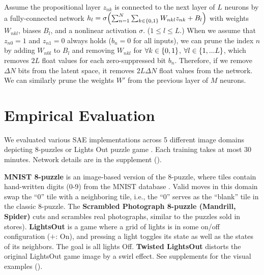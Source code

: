 Assume the propositional layer $z_{nk}$ is connected to the next layer of $L$ neurons
by a fully-connected network $h_l=\sigma{\left(\sum_{n=1}^N \sum_{k\in{\left\{0,1\right\}}} W_{nkl}z_{nk}+B_l\right)}$
with weights $W_{nkl}$, biases $B_l$, and a nonlinear activation $\sigma$.
($1\leq l \leq L$.)
When we assume that $z_{n0}=1$ and $z_{n1}=0$ always holds ($b_n=0$ for all inputs),
we can prune the index $n$
by adding $W_{n0l}$ to $B_l$ and removing $W_{nkl}$ for $\forall k\in{\left\{0,1\right\}}$, $\forall l \in {\left\{1,...L\right\}}$,
which removes $2L$ float values for each zero-suppressed bit $b_n$.
Therefore, if we remove $\Delta N$ bits from the latent space, it removes $2L\Delta N$ float values from the network.
We can similarly prune the weights $W'$ from the previous layer of $M$ neurons.



\section{Empirical Evaluation}
\label{evaluation}

We evaluated various SAE implementations across 5 different
image domains depicting 8-puzzles or Lights Out puzzle game \cite{lightsout}.
Each training takes at most 30 minutes.
Network details are in the supplement ().

\textbf{MNIST 8-puzzle}
is an image-based version of the 8-puzzle, where tiles contain hand-written digits (0-9) from the  MNIST database \cite{lecun1998gradient}.
Valid moves in this domain swap the ``0'' tile  with a neighboring tile, i.e., the ``0'' serves as the ``blank'' tile in the classic 8-puzzle. 
The \textbf{Scrambled Photograph 8-puzzle (Mandrill, Spider)} cuts and scrambles real photographs, similar to the puzzles sold in stores).
\textbf{LightsOut} \cite{lightsout} is
a game where a grid of lights is in some on/off configuration ($+$: On),
and pressing a light toggles its state as well as the states of its neighbors.
The goal is all lights Off.
\textbf{Twisted LightsOut} distorts the original LightsOut game image by a swirl effect.
See supplements for the visual examples ().

